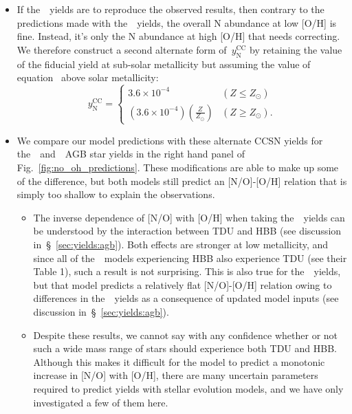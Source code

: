 \documentclass[ms.tex]{subfiles}
\begin{document}
\begin{itemize}
\begin{itemize}
		\item If the~\karakas~yields are to reproduce the observed results, 
		then contrary to the predictions made with the~\karakasten~yields, the 
		overall N abundance at low [O/H] is fine. 
		Instead, it's only the N abundance at high [O/H] that needs 
		correcting. 
		We therefore construct a second alternate form of~$y_\text{N}^\text{CC}$ 
		by retaining the value of the fiducial yield at sub-solar metallicity 
		but assuming the value of equation~ above solar 
		metallicity: 
		\begin{equation} 
		y_\text{N}^\text{CC} = \begin{cases} 
		3.6\times10^{-4} & (Z \leq Z_\odot) 
		\\ 
		(3.6\times10^{-4})\left(\frac{Z}{Z_\odot}\right) & (Z \geq Z_\odot). 
		\end{cases} 
		\label{eq:broken_yncc} 
		\end{equation} 

		\item We compare our model predictions with these alternate CCSN yields 
		for the~\karakasten~and~\karakas~AGB star yields in the right hand 
		panel of Fig.~\ref{fig:no_oh_predictions}. 
		These modifications are able to make up some of the difference, but 
		both models still predict an [N/O]-[O/H] relation that is simply too 
		shallow to explain the observations. 
		\begin{itemize} 
			\item The inverse dependence of [N/O] with [O/H] when taking 
			the~\karakasten~yields can be understood by the interaction between 
			TDU and HBB (see discussion in~\S~\ref{sec:yields:agb}). 
			Both effects are stronger at low metallicity, and since all of 
			the~\karakasten~models experiencing HBB also experience TDU (see 
			their Table 1), such a result is not surprising. 
			This is also true for the~\karakas~yields, but that model predicts 
			a relatively flat [N/O]-[O/H] relation owing to differences in
			the~\Nfourteen~yields as a consequence of updated model inputs
			(see discussion in~\S~\ref{sec:yields:agb}).
			
			\item Despite these results, we cannot say with any confidence
			whether or not such a wide mass range of stars should experience
			both TDU and HBB.
			Although this makes it difficult for the model to predict a
			monotonic increase in [N/O] with [O/H], there are many uncertain
			parameters required to predict yields with stellar evolution
			models, and we have only investigated a few of them here.
			\end{itemize} 


\end{itemize}
\end{itemize}
\end{document}
